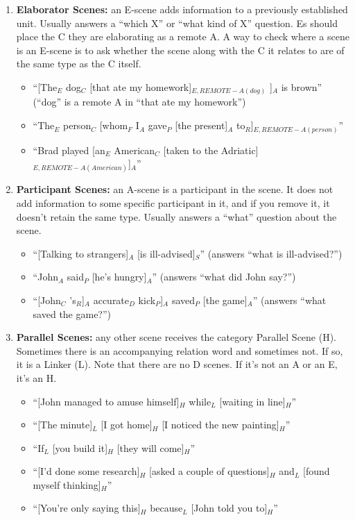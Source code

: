 \documentclass[11pt]{article}
\begin{document}
\begin{enumerate}
\item
\textbf{Elaborator Scenes:} an E-scene adds information to a previously established unit. Usually answers a ``which X'' or ``what kind of X'' question. Es should place the C they are elaborating as a remote A. A way to check where a scene is an E-scene is to ask whether the scene along with the C it relates to are of the same type as the C itself.
\begin{itemize}
\item
``[The$_E$ dog$_C$ [that ate my homework]$_{E, REMOTE-A(dog)}$ ]$_A$ is brown'' (``dog'' is a remote A in ``that ate my homework'')
\item
``The$_E$ person$_C$ [whom$_F$ I$_A$ gave$_P$ [the present]$_A$ to$_R$]$_{E,REMOTE-A(person)}$''
\item
``Brad played [an$_E$ American$_C$ [taken to the Adriatic]$_{E,REMOTE-A(American)}$]$_A$''
\end{itemize}

\item
\textbf{Participant Scenes:} an A-scene is a participant in the scene. It does not add information to some specific participant in it, and if you remove it, it doesn't retain the same type. Usually answers a ``what'' question about the scene.

\begin{itemize}
\item
``[Talking to strangers]$_A$ [is ill-advised]$_S$'' (answers ``what is ill-advised?'')
\item
``John$_A$ said$_P$ [he's hungry]$_A$'' (answers ``what did John say?'')
\item
``[John$_C$ 's$_R$]$_A$ accurate$_D$ kick$_P$]$_A$ saved$_P$ [the game]$_A$'' (answers ``what saved the game?'')
\end{itemize}

\item
{\bf Parallel Scenes:} any other scene receives the category Parallel Scene (H). Sometimes there is an accompanying relation word and sometimes not. If so, it is a Linker (L). Note that there are no D scenes. If it's not an A or an E, it's an H.

\begin{itemize}
\item
``[John managed to amuse himself]$_H$ while$_L$ [waiting in line]$_H$''
\item
``[The minute]$_L$ [I got home]$_H$ [I noticed the new painting]$_H$''
\item
``If$_L$ [you build it]$_H$ [they will come]$_H$''
\item
``[I'd done some research]$_H$ [asked a couple of questions]$_H$ and$_L$ [found myself thinking]$_H$''
\item
``[You're only saying this]$_H$ because$_L$ [John told you to]$_H$''
\end{itemize}


\end{enumerate}
\end{document}
